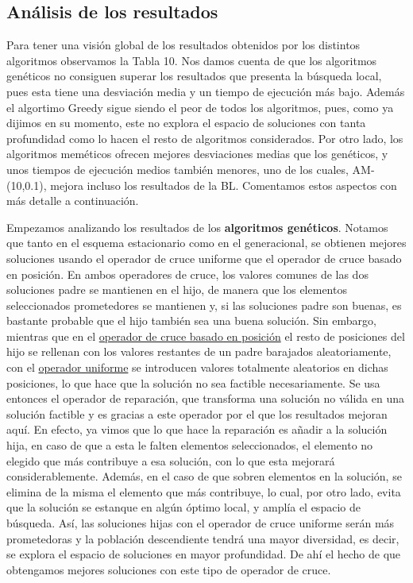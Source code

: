 \documentclass[10pt,a4paper]{article}
\begin{document}
	\subsection{ Análisis de los resultados }
	
	Para tener una visión global de los resultados obtenidos por los distintos algoritmos observamos la Tabla 10. Nos damos cuenta de que los algoritmos genéticos no consiguen superar los resultados que presenta la búsqueda local, pues esta tiene una desviación media y un tiempo de ejecución más bajo. Además el algortimo Greedy sigue siendo el peor de todos los algoritmos, pues, como ya dijimos en su momento, este no explora el espacio de soluciones con tanta profundidad como lo hacen el resto de algoritmos considerados. Por otro lado, los algoritmos meméticos ofrecen mejores desviaciones medias que los genéticos, y unos tiempos de ejecución medios también menores, uno de los cuales, AM-(10,0.1), mejora incluso los resultados de la BL. Comentamos estos aspectos con más detalle a continuación. 
	
	Empezamos analizando los resultados de los \textbf{algoritmos genéticos}. Notamos que tanto en el esquema estacionario como en el generacional, se obtienen mejores soluciones usando el operador de cruce uniforme que el operador de cruce basado en posición. En ambos operadores de cruce, los valores comunes de las dos soluciones padre se mantienen en el hijo, de manera que los elementos seleccionados prometedores se mantienen y, si las soluciones padre son buenas, es bastante probable que el hijo también sea una buena solución. Sin embargo, mientras que en el \underline{operador de cruce basado en posición} el resto de posiciones del hijo se rellenan con los valores restantes de un padre barajados aleatoriamente, con el \underline{operador uniforme} se introducen valores totalmente aleatorios en dichas posiciones, lo que hace que la solución no sea factible necesariamente. Se usa entonces el operador de reparación, que transforma una solución no válida en una solución factible y es gracias a este operador por el que los resultados mejoran aquí. En efecto, ya vimos que lo que hace la reparación es añadir a la solución hija, en caso de que a esta le falten elementos seleccionados, el elemento no elegido que más contribuye a esa solución, con lo que esta mejorará considerablemente. Además, en el caso de que sobren elementos en la solución, se elimina de la misma el elemento que más contribuye, lo cual, por otro lado, evita que la solución se estanque en algún óptimo local, y amplía el espacio de búsqueda. Así, las soluciones hijas con el operador de cruce uniforme serán más prometedoras y la población descendiente tendrá una mayor diversidad, es decir, se explora el espacio de soluciones en mayor profundidad. De ahí el hecho de que obtengamos mejores soluciones con este tipo de operador de cruce. 
	
\end{document}
